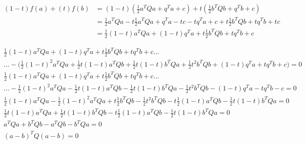 \documentclass{article}
\begin{document}
\begin{equation}
\begin{split}
(1-t)f(a) + (t)f(b) &= (1-t)(\frac{1}{2} a^TQa+q^Ta+c) 									+ t(\frac{1}{2} b^TQb+q^Tb+c)\\
					&= \frac{1}{2} a^TQa-t\frac{1}{2} a^TQa+q^Ta-tc -tq^Ta+c + t\frac{1}{2} b^TQb+tq^Tb+tc\\
&=\frac{1}{2}(1-t)a^TQa +(1-t)q^Ta + t\frac{1}{2} b^TQb+tq^Tb +c
\end{split}
\end{equation}


\begin{equation}
\begin{split}
\frac{1}{2}(1-t)a^TQa +(1-t)q^Ta + t\frac{1}{2} b^TQb+tq^Tb +c \dots\\
\dots -\big(\frac{1}{2}(1-t)^2 a^TQa + \frac{1}{2}t(1-t)a^TQb + \frac{1}{2}t(1-t)b^TQa + \frac{1}{2}t^2b^TQb + (1-t)q^Ta+t q^Tb +c \big) = 0\\
\frac{1}{2}(1-t)a^TQa +(1-t)q^Ta + t\frac{1}{2} b^TQb+tq^Tb +c\dots\\
\dots -\frac{1}{2}(1-t)^2 a^TQa - \frac{1}{2}t(1-t)a^TQb - \frac{1}{2}t(1-t)b^TQa - \frac{1}{2}t^2b^TQb - (1-t)q^Ta-t q^Tb -c = 0\\
\frac{1}{2}(1-t)a^TQa -\frac{1}{2}(1-t)^2 a^TQa + t\frac{1}{2} b^TQb - \frac{1}{2}t^2b^TQb - t\frac{1}{2}(1-t)a^TQb - \frac{1}{2}t(1-t)b^TQa  = 0\\
\frac{1}{2}t(1-t)a^TQa + \frac{1}{2} t(1-t)b^TQb                  - t\frac{1}{2}(1-t)a^TQb - \frac{1}{2}t(1-t)b^TQa  = 0\\
a^TQa +  b^TQb                  - a^TQb - b^TQa  = 0\\
(a-b)^TQ(a-b)  = 0\\
\end{split}
\end{equation}
\end{document}
